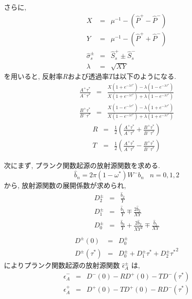 さらに,
\begin{eqnarray}
  X & = & \mu^{-1} - (\hat{P}^+ - \hat{P}^- ) \\
  Y & = & \mu^{-1} - (\hat{P}^+ + \hat{P}^- ) \\
  \hat{\sigma}_s^{\pm} & = & \hat{S}_s^+ \pm \hat{S}_s^- \\
  \lambda & = & \sqrt{XY}
\end{eqnarray}
を用いると, 反射率$R$および透過率$T$は以下のようになる.
\begin{eqnarray}
 \frac{A^+{\tau^*}}{A^-{\tau^*}}
  & = & \frac{X (1+e^{-\lambda\tau^*}) - \lambda (1-e^{-\lambda\tau^*})}
             {X (1+e^{-\lambda\tau^*}) + \lambda (1-e^{-\lambda\tau^*})} \\
 \frac{B^+{\tau^*}}{B^-{\tau^*}}
  & = & \frac{X (1-e^{-\lambda\tau^*}) - \lambda (1+e^{-\lambda\tau^*})}
             {X (1-e^{-\lambda\tau^*}) + \lambda (1+e^{-\lambda\tau^*})}
\end{eqnarray}
\begin{eqnarray}
  R & = &  \frac{1}{2} \left(  \frac{A^+{\tau^*}}{A^-{\tau^*}} 
                             + \frac{B^+{\tau^*}}{B^-{\tau^*}} \right) \\
  T & = &  \frac{1}{2} \left(  \frac{A^+{\tau^*}}{A^-{\tau^*}} 
                             - \frac{B^+{\tau^*}}{B^-{\tau^*}} \right)
\end{eqnarray}

次にまず, プランク関数起源の放射源関数を求める.
\begin{equation}
  \hat{b}_n = 2 \pi (1-\omega^*) W^- b_n \; \; \; n=0,1,2 
\end{equation}
から, 放射源関数の展開係数が求められ,
\begin{eqnarray}
  D_2^\pm & = & \frac{\hat{b}_2}{Y} \\
  D_1^\pm & = & \frac{\hat{b}_1}{Y} \mp  \frac{2 \hat{b}_2}{XY} \\
  D_0^\pm & = & \frac{\hat{b}_0}{Y} + \frac{2 \hat{b}_2}{XY^2} 
                \mp  \frac{\hat{b}_1}{XY} \\
\end{eqnarray}
\begin{eqnarray}
  D^\pm(0)      & = & D_0^{\pm} \\
  D^\pm(\tau^*) & = & D_0^{\pm} + D_1^{\pm} \tau^* + D_2^{\pm} {\tau^*}^2
\end{eqnarray}
によりプランク関数起源の放射源関数 $\hat{\epsilon}_A^\pm$ は,
\begin{eqnarray}
  \hat{\epsilon}_A^- & = & D^-(0) - R D^+(0) - T D^-(\tau^*) \\
  \hat{\epsilon}_A^+ & = & D^+(0) - T D^+(0) - R D^-(\tau^*)
\end{eqnarray}

